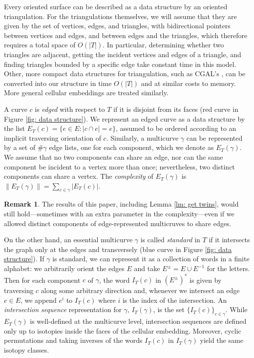 \documentclass[11pt]{amsart}
\numberwithin{equation}{section}
\theoremstyle{plain}
\theoremstyle{definition}
\newtheorem{remark}[equation]{Remark}
\begin{document}
Every oriented surface can be described as a data structure by an oriented triangulation.
For the triangulations themselves, we will assume that they are given by the set of vertices, edges, and triangles, with bidirectional pointers between vertices and edges, and between edges and the triangles, which therefore requires a total space of $O(|T|)$.
In particular, determining whether two triangles are adjacent, getting the incident vertices and edges of a triangle, and finding triangles bounded by a specific edge take constant time in this model. 
Other, more compact data structures for triangulation, such as CGAL's \cite{devillers2000triangulations}, can be converted into our structure in time $O(|T|)$ and at similar costs to memory.
More general cellular embeddings are treated similarly.

A curve $c$ is \textit{edged} with respect to $T$ if it is disjoint from its faces (red curve in Figure \ref{fig: data structure}).
We represent an edged curve as a data structure by the list $E_T(c)=\{e\in E:|c\cap e|=e\}$, assumed to be ordered according to an implicit traversing orientation of $c$. 
Similarly, a multicurve $\gamma$ can be represented by a set of $\#\gamma$ edge lists, one for each component, which we denote as $E_T(\gamma)$. 
We assume that no two components can share an edge, nor can the same component be incident to a vertex more than once; nevertheless, two distinct components can share a vertex. 
The \textit{complexity} of $E_T(\gamma)$ is $\|E_T(\gamma)\|=\sum_{c\in \gamma}|E_T(c)|$.

\begin{remark}
    The results of this paper, including Lemma \ref{lm: get twins}, would still hold---sometimes with an extra parameter in the complexity---even if we allowed distinct components of edge-represented multicruves to share edges.
\end{remark}

On the other hand, an essential multicurve $\gamma$ is called \textit{standard} in $T$ if it intersects the graph only at the edges and transversely (blue curve in Figure \ref{fig: data structure}).
If $\gamma$ is standard, we can represent it as a collection of words in a finite alphabet: we arbitrarily orient the edges $E$ and take $E^{\pm} = E\cup E^{-1}$ for the letters.
Then for each component $c$ of $\gamma$, the word $I_T(c)$ in $(E^{\pm})^*$ is given by traversing $c$ along some arbitrary direction and, whenever we intersect an edge $e\in E$, we append $e^i$ to $I_T(c)$ where $i$ is the index of the intersection. 
An \textit{intersection sequence} representation for $\gamma$, $I_T(\gamma)$, is the set $\{I_T(c)\}_{c \in \gamma}$.
While $E_T(\gamma)$ is well-defined at the multicurve level, intersection sequences are defined only up to isotopies inside the faces of the cellular embedding.
Moreover, cyclic permutations and taking inverses of the words $I_T(c)$ in $I_T(\gamma)$ yield the same isotopy classes.
\end{document}
